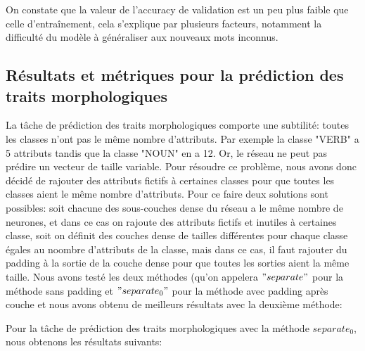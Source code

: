 \documentclass[a4paper]{article}
\begin{document}
On constate que la valeur de l'accuracy de validation est un peu plus faible que celle d'entraînement, cela 
s'explique par plusieurs facteurs, notamment la difficulté du modèle à généraliser aux nouveaux mots inconnus.

\subsection{Résultats et métriques pour la prédiction des traits morphologiques}

La tâche de prédiction des traits morphologiques comporte une subtilité: toutes les classes n'ont pas le même 
nombre d'attributs. Par exemple la classe "VERB" a 5 attributs tandis que la classe "NOUN" en a 12. Or, le 
réseau ne
peut pas prédire un vecteur de taille variable. Pour résoudre ce problème, nous avons donc décidé de rajouter 
des attributs fictifs à certaines classes pour que toutes les classes aient le même nombre d'attributs. Pour 
ce faire 
deux solutions sont possibles: soit chacune des sous-couches dense du réseau a le même nombre de neurones, et 
dans ce cas on rajoute des attributs fictifs et inutiles à certaines classe,
soit on définit des couches dense de tailles différentes pour chaque classe égales au noombre d'attributs de 
la classe, mais dans ce cas, il faut rajouter
du padding à la sortie de la couche dense pour que toutes les sorties aient la même taille. Nous avons testé 
les deux méthodes (qu'on appelera $"separate"$ pour la méthode sans padding et $"separate_0"$ pour la méthode 
avec padding après couche et nous avons obtenu de meilleurs résultats avec la deuxième méthode:

Pour la tâche de prédiction des traits morphologiques avec la méthode $separate_0$, nous obtenons les résultats 
suivants: %
\end{document}
